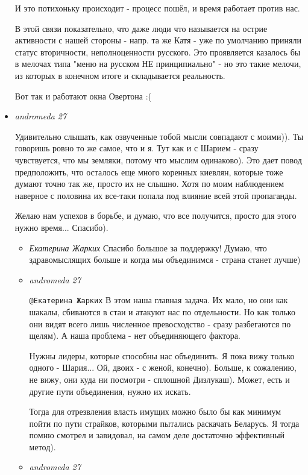 \begin{itemize}
И это потихоньку происходит - процесс пошёл, и время работает против нас.

В этой связи показательно, что даже люди что называется на острие активности с
нашей стороны - напр. та же Катя - уже по умолчанию приняли статус вторичности,
неполноценности русского. Это проявляется казалось бы в мелочах типа "меню на
русском НЕ принципиально" - но это такие мелочи, из которых в конечном итоге и
складывается реальность.

Вот так и работают окна Овертона :(

\item \emph{andromeda 27}

Удивительно слышать, как озвученные тобой мысли совпадают с моими)). Ты
говоришь ровно то же самое, что и я. Тут как и с Шарием - сразу чувствуется,
что мы земляки, потому что мыслим одинаково). Это дает повод предположить, что
осталось еще много коренных киевлян, которые тоже думают точно так же, просто
их не слышно. Хотя по моим наблюдением наверное с половина их все-таки попала
под влияние всей этой пропаганды.

Желаю нам успехов в борьбе, и думаю, что все получится, просто для этого нужно
время... Спасибо).

\begin{itemize}
\item \emph{Екатерина Жарких}
Спасибо большое за поддержку! Думаю, что здравомыслящих больше и когда мы объединимся - страна станет лучше)

\item \emph{andromeda 27}

\verb|@Екатерина Жарких|  В этом наша главная задача. Их мало, но они как
шакалы, сбиваются в стаи и атакуют нас по отдельности. Но как только они видят
всего лишь численное превосходство - сразу разбегаются по щелям). А наша
проблема - нет объединяющего фактора. 

Нужны лидеры, которые способны нас объединить. Я пока вижу только одного -
Шария... Ой, двоих - с женой, конечно). Больше, к сожалению, не вижу, они куда
ни посмотри - сплошной Дизлукаш). Может, есть и другие пути объединения, нужно
их искать. 

Тогда для отрезвления власть имущих можно было бы как минимум пойти по пути
страйков, которыми пытались раскачать Беларусь. Я тогда помню смотрел и
завидовал, на самом деле достаточно эффективный метод).

\item \emph{andromeda 27}


\end{itemize}
\end{itemize}
